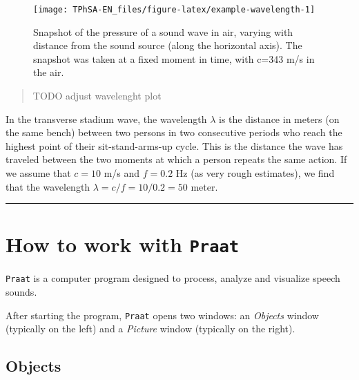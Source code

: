 \documentclass[
]{book}
\begin{document}
\begin{figure}

{\centering \texttt{[image: TPhSA-EN\_files/figure-latex/example-wavelength-1]} 

}

\caption{Snapshot of the pressure of a sound wave in air, varying with distance from the sound source (along the horizontal axis). The snapshot was taken at a fixed moment in time, with c=343 m/s in the air. }\label{fig:example-wavelength}
\end{figure}

\begin{quote}
TODO adjust wavelenght plot
\end{quote}

In the transverse stadium wave, the wavelength \(\lambda\) is the distance in meters (on the same bench) between two persons in two consecutive periods who reach the highest point of their sit-stand-arms-up cycle. This is the distance the wave has traveled between the two moments at which a person repeats the same action. If we assume that \(c=10\) m/s and \(f=0.2\) Hz (as very rough estimates), we find that the wavelength \(\lambda=c/f=10/0.2=50\) meter.

\begin{center}\rule{0.5\linewidth}{0.5pt}\end{center}

\label{box-praatintro}
\section{\texorpdfstring{How to work with \texttt{Praat}}{How to work with Praat}}\label{sec:praatintro}

\texttt{Praat} is a computer program designed to process, analyze and visualize speech sounds.

After starting the program, \texttt{Praat} opens two windows: an \emph{Objects} window (typically on the left) and a \emph{Picture} window (typically on the right).

\subsection*{Objects}\label{objects}
\end{document}
